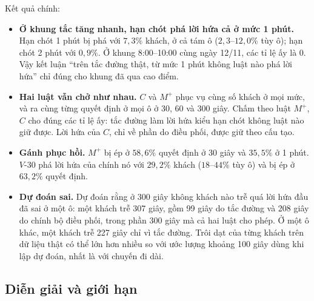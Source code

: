 Kết quả chính:
\begin{itemize}
\item \textbf{Ở khung tắc tăng nhanh, hạn chót phá lời hứa cả ở mức 1 phút.} Hạn chót 1 phút bị phá với $7{,}3\%$ khách, ở
cả tám ô ($2{,}3$--$12{,}0\%$ tùy ô); hạn chót 2 phút với $0{,}9\%$. Ở khung 8:00--10:00 cùng ngày 12/11, các tỉ lệ ấy là 0.
Vậy kết luận ``trên tắc đường thật, từ mức 1 phút không luật nào phá lời hứa'' chỉ đúng cho khung đã qua cao điểm.
\item \textbf{Hai luật vẫn chở như nhau.} $C$ và $M^{+}$ phục vụ cùng số khách ở mọi mức, và ra cùng từng quyết định ở mọi
ô ở 30, 60 và 300 giây. Chấm theo luật $M^{+}$, $C$ cho đúng các tỉ lệ ấy: tắc đường làm lời hứa kiểu hạn chót không luật
nào giữ được. Lời hứa của $C$, chỉ về phần do điều phối, được giữ theo cấu tạo.
\item \textbf{Gánh phục hồi.} $M^{+}$ bị ép ở $58{,}6\%$ quyết định ở 30 giây và $35{,}5\%$ ở 1 phút. $V$-30 phá lời hứa của
chính nó với $29{,}2\%$ khách ($18$--$44\%$ tùy ô) và bị ép ở $63{,}2\%$ quyết định.
\item \textbf{Dự đoán sai.} Dự đoán rằng ở 300 giây không khách nào trễ quá lời hứa đầu đã sai ở một ô: một khách trễ 307 giây,
gồm 99 giây do tắc đường và 208 giây do chính bộ điều phối, trong phần 300 giây mà cả hai luật cho phép. Ở một ô khác, một khách
trễ 227 giây chỉ vì tắc đường. Trôi dạt của từng khách trên dữ liệu thật có thể lớn hơn nhiều so với ước lượng khoảng 100 giây
dùng khi lập dự đoán, nhất là với chuyến đi dài.
\end{itemize}

\subsection{Diễn giải và giới hạn}

